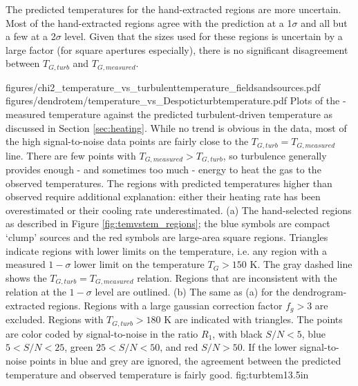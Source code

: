 The predicted temperatures for the hand-extracted regions are more uncertain.
Most of the hand-extracted regions agree with the prediction at a 1$\sigma$ and
all but a few at a 2$\sigma$ level.  Given that the sizes used for these
regions is uncertain by a large factor (for square apertures especially), there
is no significant disagreement between $T_{G,turb}$ and $T_{G,measured}$.


\FigureTwo
{figures/chi2_temperature_vs_turbulenttemperature_fieldsandsources.pdf} %
{figures/dendrotem/temperature_vs_Despoticturbtemperature.pdf} %
{Plots of the \formaldehyde-measured temperature against the predicted
turbulent-driven temperature as discussed in Section \ref{sec:heating}.
While no trend is obvious in the data, most of the high signal-to-noise
data points are fairly close to the  $T_{G,turb} = T_{G,measured}$ line.
There are few points with $T_{G,measured} > T_{G,turb}$, so turbulence generally provides
enough - and sometimes too much - energy to heat the gas to the observed temperatures.
The regions with predicted temperatures higher than observed require additional
explanation: either their heating rate has been overestimated or their cooling
rate underestimated.
(a) The hand-selected regions as described in Figure
\ref{fig:temvstem_regions}; the blue symbols are compact `clump' sources and
the red symbols are large-area square regions. 
Triangles indicate regions with lower limits on
the temperature, i.e. any region with
a measured $1-\sigma$ lower limit on the temperature $T_G>150$ K.  The gray
dashed line shows the $T_{G,turb} = T_{G,measured}$ relation.  Regions that are inconsistent
with the relation at the $1-\sigma$ level are outlined.
(b) The same as (a) for the dendrogram-extracted regions.  Regions with a large
gaussian correction factor $f_g>3$ are excluded.  Regions with $T_{G,turb}>180$ K
are indicated with triangles.
The points are color coded by signal-to-noise in the ratio $R_1$, with black
$S/N < 5$, blue $5 < S/N < 25$, green $25 < S/N < 50$, and red $S/N > 50$. 
If the lower signal-to-noise points in blue and grey are ignored, the agreement
between the predicted temperature and observed temperature is fairly good.
}
{fig:turbtem}{1}{3.5in}

